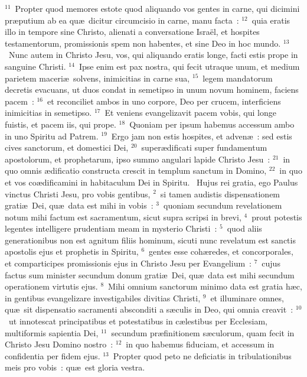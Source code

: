 ${}^{11}$~Propter quod memores estote quod aliquando vos gentes in carne, qui dicimini pr\ae putium ab ea qu\ae\ dicitur circumcisio in carne, manu facta~:
${}^{12}$~quia eratis illo in tempore sine Christo, alienati a conversatione Isra\"el, et hospites testamentorum, promissionis spem non habentes, et sine Deo in hoc mundo.
${}^{13}$~Nunc autem in Christo Jesu, vos, qui aliquando eratis longe, facti estis prope in sanguine Christi.
${}^{14}$~Ipse enim est pax nostra, qui fecit utraque unum, et medium parietem maceri\ae\ solvens, inimicitias in carne sua,
${}^{15}$~legem mandatorum decretis evacuans, ut duos condat in semetipso in unum novum hominem, faciens pacem~:
${}^{16}$~et reconciliet ambos in uno corpore, Deo per crucem, interficiens inimicitias in semetipso.
${}^{17}$~Et veniens evangelizavit pacem vobis, qui longe fuistis, et pacem iis, qui prope.
${}^{18}$~Quoniam per ipsum habemus accessum ambo in uno Spiritu ad Patrem.
${}^{19}$~Ergo jam non estis hospites, et adven\ae~: sed estis cives sanctorum, et domestici Dei,
${}^{20}$~super\ae dificati super fundamentum apostolorum, et prophetarum, ipso summo angulari lapide Christo Jesu~:
${}^{21}$~in quo omnis \ae dificatio constructa crescit in templum sanctum in Domino,
${}^{22}$~in quo et vos co\ae dificamini in habitaculum Dei in Spiritu.
~Hujus rei gratia, ego Paulus vinctus Christi Jesu, pro vobis gentibus,
${}^{2}$~si tamen audistis dispensationem grati\ae\ Dei, qu\ae\ data est mihi in vobis~:
${}^{3}$~quoniam secundum revelationem notum mihi factum est sacramentum, sicut supra scripsi in brevi,
${}^{4}$~prout potestis legentes intelligere prudentiam meam in mysterio Christi~:
${}^{5}$~quod aliis generationibus non est agnitum filiis hominum, sicuti nunc revelatum est sanctis apostolis ejus et prophetis in Spiritu,
${}^{6}$~gentes esse coh\ae redes, et concorporales, et comparticipes promissionis ejus in Christo Jesu per Evangelium~:
${}^{7}$~cujus factus sum minister secundum donum grati\ae\ Dei, qu\ae\ data est mihi secundum operationem virtutis ejus.
${}^{8}$~Mihi omnium sanctorum minimo data est gratia h\ae c, in gentibus evangelizare investigabiles divitias Christi,
${}^{9}$~et illuminare omnes, qu\ae\ sit dispensatio sacramenti absconditi a s\ae culis in Deo, qui omnia creavit~:
${}^{10}$~ut innotescat principatibus et potestatibus in c\ae lestibus per Ecclesiam, multiformis sapientia Dei,
${}^{11}$~secundum pr\ae finitionem s\ae culorum, quam fecit in Christo Jesu Domino nostro~:
${}^{12}$~in quo habemus fiduciam, et accessum in confidentia per fidem ejus.
${}^{13}$~Propter quod peto ne deficiatis in tribulationibus meis pro vobis~: qu\ae\ est gloria vestra.


